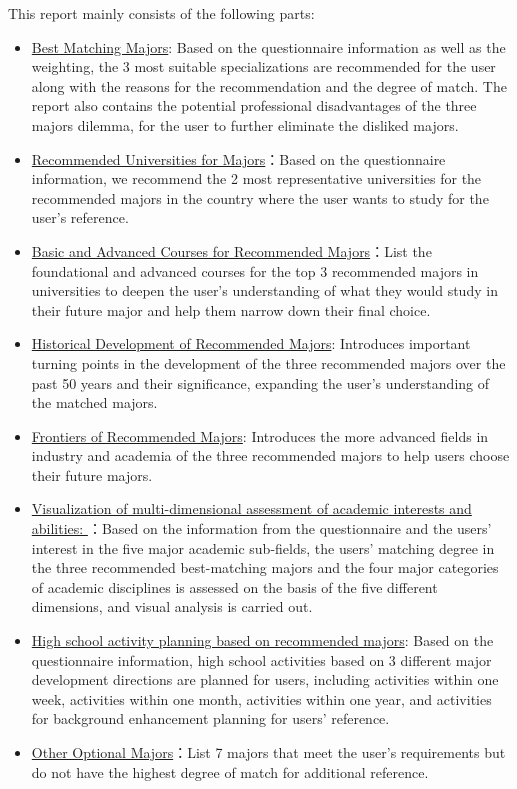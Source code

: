 \documentclass[12pt]{article}
\begin{document}
\begin{CJK*}{UTF8}{gbsn}
\newpage
\hspace{0pt}
\vspace{0cm}
\begin{flushleft}
This report mainly consists of the following parts:
\begin{itemize}
    \item \underline{Best Matching Majors}: Based on the questionnaire information as well as the weighting, the 3 most suitable specializations are recommended for the user along with the reasons for the recommendation and the degree of match. The report also contains the potential professional disadvantages of the three majors dilemma, for the user to further eliminate the disliked majors.
    \item \underline{Recommended Universities for Majors}：Based on the questionnaire information, we recommend the 2 most representative universities for the recommended majors in the country where the user wants to study for the user's reference.
    \item \underline{Basic and Advanced Courses for Recommended Majors}：List the foundational and advanced courses for the top 3 recommended majors in universities to deepen the user's understanding of what they would study in their future major and help them narrow down their final choice.
    \item \underline{Historical Development of Recommended Majors}: Introduces important turning points in the development of the three recommended majors over the past 50 years and their significance, expanding the user's understanding of the matched majors.
    \item \underline{Frontiers of Recommended Majors}: Introduces the more advanced fields in industry and academia of the three recommended majors to help users choose their future majors.
    \item \underline{Visualization of multi-dimensional assessment of academic interests and abilities: }：Based on the information from the questionnaire and the users' interest in the five major academic sub-fields, the users' matching degree in the three recommended best-matching majors and the four major categories of academic disciplines is assessed on the basis of the five different dimensions, and visual analysis is carried out.
    \item \underline{High school activity planning based on recommended majors}: Based on the questionnaire information, high school activities based on 3 different major development directions are planned for users, including activities within one week, activities within one month, activities within one year, and activities for background enhancement planning for users' reference.
    \item \underline{Other Optional Majors}：List 7 majors that meet the user's requirements but do not have the highest degree of match for additional reference.
\end{itemize}
\end{flushleft}
\hspace{0pt}
\vfill


\end{CJK*}
\end{document}
